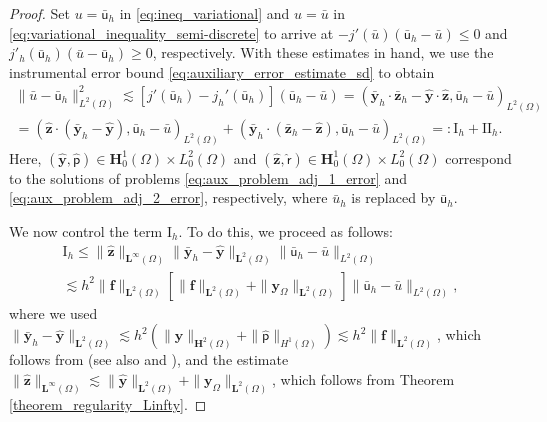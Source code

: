 \documentclass[final]{siamart0216}
\begin{document}
\begin{proof}
Set $u =\bar{\mathsf{u}}_h$ in \eqref{eq:ineq_variational} and $u=\bar{u}$ in \eqref{eq:variational_inequality_semi-discrete} to arrive at $-j'(\bar{u})(\bar{\mathsf{u}}_h-\bar{u})\leq 0$ and $j'_h(\bar{\mathsf{u}}_h)(\bar{u}-\bar{\mathsf{u}}_h)\geq 0$, respectively. With these estimates in hand, we use the instrumental error bound \eqref{eq:auxiliary_error_estimate_sd} to obtain
\begin{multline*}\label{eq:estimates_aux_error_semi-discrete}
\|\bar{u}-\bar{\mathsf{u}}_h\|_{L^2(\Omega)}^2
\lesssim [j'(\bar{\mathsf{u}}_h)-j_h'(\bar{\mathsf{u}}_h)](\bar{\mathsf{u}}_h-\bar{u})
=(\bar{\mathbf{y}}_h \cdot \bar{\mathbf{z}}_h-\hat{\mathbf{y}}\cdot\hat{\mathbf{z}},\bar{\mathsf{u}}_h-\bar{u})_{L^2(\Omega)}
\\
=(\hat{\mathbf{z}}\cdot(\bar{\mathbf{y}}_h-\hat{\mathbf{y}}),\bar{\mathsf{u}}_h-\bar{u})_{L^2(\Omega)}
+(\bar{\mathbf{y}}_h\cdot (\bar{\mathbf{z}}_h-\hat{\mathbf{z}}),\bar{\mathsf{u}}_h-\bar{u})_{L^2(\Omega)}
=:\text{I}_h +\text{II}_h.
\end{multline*}
Here, $(\hat{\mathbf{y}},\hat{\mathsf{p}})\in \mathbf{H}_0^1(\Omega)\times L_0^2(\Omega)$ and $(\hat{\mathbf{z}},\hat{\mathsf{r}})\in \mathbf{H}_0^1(\Omega)\times L_0^2(\Omega)$ correspond to the solutions of problems \eqref{eq:aux_problem_adj_1_error} and \eqref{eq:aux_problem_adj_2_error}, respectively, where $\bar{u}_h$ is replaced by $\bar{\mathsf{u}}_h$.

We now control the term $\text{I}_h$. To do this, we proceed as follows:
\begin{multline}\label{eq:estimates_I1_sd}
\text{I}_h \leq \| \hat{\mathbf{z}} \|_{\mathbf{L}^{\infty}(\Omega)}\|\bar{\mathbf{y}}_h-\hat{\mathbf{y}}\|_{\mathbf{L}^2(\Omega)}\|\bar{\mathsf{u}}_h-\bar{u}\|_{L^2(\Omega)}
\\
\lesssim h^2\|\mathbf{f}\|_{\mathbf{L}^2(\Omega)}\left[\|\mathbf{f}\|_{\mathbf{L}^2(\Omega)}+\|\mathbf{y}_{\Omega}\|_{\mathbf{L}^2(\Omega)}\right]\|\bar{\mathsf{u}}_h-\bar{u}\|_{L^2(\Omega)},
\end{multline}
where we used $\|\bar{\mathbf{y}}_h-\hat{\mathbf{y}}\|_{\mathbf{L}^2(\Omega)} \lesssim h^2 ( \| \hat{\mathbf{y}} \|_{\mathbf{H}^{2}(\Omega)} + \| \hat{\mathsf{p}} \|_{H^1(\Omega)}) \lesssim h^2 \| \mathbf{f} \|_{\mathbf{L}^{2}(\Omega)}$, which follows from \cite[Proposition 41.8]{Guermond-Ern} (see also \cite[Theorem 4.21]{Guermond-Ern} and \cite[Theorem 4.26]{Guermond-Ern}), and the estimate $ \| \hat{\mathbf{z}} \|_{\mathbf{L}^{\infty}(\Omega)} \lesssim \| \hat{\mathbf{y}} \|_{\mathbf{L}^{2}(\Omega)} + \| \mathbf{y}_{\Omega} \|_{\mathbf{L}^{2}(\Omega)}$, which follows from Theorem \ref{theorem_regularity_Linfty}.


\end{proof}
\end{document}
